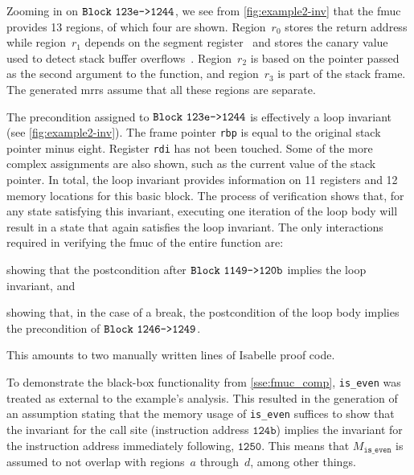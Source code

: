 Zooming in on $\texttt{Block}~\mathtt{123e\texttt{->}1244}$, we see from \cref{fig:example2-inv}
that the \ac{fmuc} provides 13 regions, of which four are shown.
Region~$r_0$ stores the return address
while region~$r_1$ depends on the segment register~
and stores the canary value
used to detect stack buffer overflows~\citep{cowan1998stackguard}.%
Region~$r_2$ is based on the pointer passed as the second argument to the function,
and region~$r_3$ is part of the stack frame.
The generated \acp{mrr} assume that all these regions are separate.

The precondition assigned to $\texttt{Block}~\mathtt{123e\texttt{->}1244}$
is effectively a loop invariant (see \cref{fig:example2-inv}).%
The frame pointer \lstinline|rbp|%
is equal to the original stack pointer minus eight.%
Register \lstinline|rdi| has not been touched.
Some of the more complex assignments are also shown,
such as the current value of the stack pointer.
In total, the loop invariant provides information
on 11 registers and 12 memory locations for this basic block.%
The process of verification shows that,
for any state satisfying this invariant,
executing one iteration of the loop body
will result in a state that again satisfies the loop invariant.
The only interactions required in verifying the \ac{fmuc} of the entire function are:
\begin{enumerate*}
  \item showing that the postcondition after $\texttt{Block}~\mathtt{1149\texttt{->}120b}$
  implies the loop invariant, and
  \item showing that, in the case of a break, the postcondition of the loop body
  implies the precondition of $\texttt{Block}~\mathtt{1246\texttt{->}1249}$.
\end{enumerate*}
This amounts to two manually written lines of Isabelle proof code.  

To demonstrate the black-box functionality from \cref{sse:fmuc_comp},
\lstinline|is_even| was treated as external to the example's analysis.
This resulted in the generation of an assumption
stating that the memory usage of \lstinline|is_even| suffices to show that
the invariant for the call site (instruction address $\mathtt{124b}$)
implies the invariant for the instruction address immediately following,
$\mathtt{1250}$.
This means that $M_\mathtt{is\_even}$
is assumed to not overlap with regions~$a$ through~$d$, among other things.

